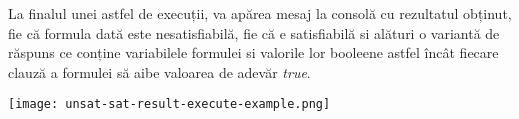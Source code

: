 La finalul unei astfel de execuții, va apărea mesaj la consolă cu rezultatul obținut, fie că formula dată este nesatisfiabilă, fie că e satisfiabilă si alături o variantă de răspuns ce conține variabilele formulei si valorile lor booleene astfel încât fiecare clauză a formulei să aibe valoarea de adevăr \textit{true}.
\newline

\texttt{[image: unsat-sat-result-execute-example.png]}

